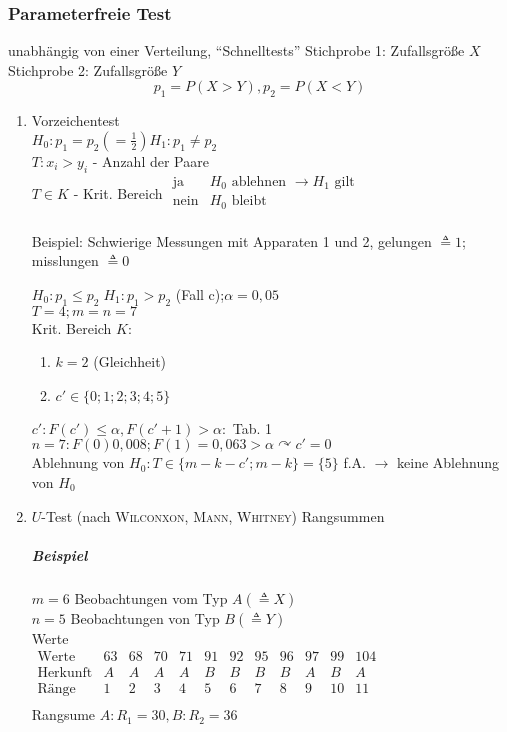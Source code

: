 \documentclass[a4paper]{scrartcl}
\begin{document}
\subsubsection{Parameterfreie Test}
unabhängig von einer Verteilung, "`Schnelltests"'
Stichprobe 1: Zufallsgröße $X$\\
Stichprobe 2: Zufallsgröße $Y$
\[ p_1 = P(X > Y), p_2 = P(X < Y)\]
\begin{enumerate}
\item Vorzeichentest\\
$H_0 : p_1 =p_2 (= \frac{1}{2}) H_1 : p_1 \neq p_2$\\
$T: x_i > y_i$ - Anzahl der Paare\\
$T \in K$ - Krit. Bereich $\begin{array}{lc} \text{ja} & H_0 \text{ ablehnen } \rightarrow H_1 \text{ gilt}\\ \text{nein} & H_0 \text{ bleibt} \\ \end{array}$

Beispiel: Schwierige Messungen mit Apparaten 1 und 2, gelungen $\triangleq 1$; misslungen $\triangleq 0$


$H_0: p_1 \leq p_2 \; H_1 : p_1 > p_2$ (Fall c);$\alpha = 0,05$\\
$T=4;m=n=7$\\
Krit. Bereich $K$:
\begin{enumerate}
\item $k=2$ (Gleichheit)
\item $c' \in \{ 0;1;2;3;4;5\}$
\end{enumerate}
$c' : F(c') \leq \alpha , F(c'+1) > \alpha :$ Tab. 1\\
$n=7 : F(0) 0,008; F(1) = 0,063 > \alpha \curvearrowright c'=0$\\
Ablehnung von $H_0: T \in \{ m - k -c'; m-k \} = \{5\}$ f.A. $\rightarrow$ keine Ablehnung von $H_0$

\item $U$-Test (nach \textsc{Wilconxon}, \textsc{Mann}, \textsc{Whitney}) Rangsummen

\subparagraph{Beispiel} $m= 6$ Beobachtungen vom Typ $A (\triangleq X)$\\
$n=5$ Beobachtungen von Typ $B (\triangleq Y)$\\
Werte\\
$\begin{array}{c|c|c|c|c|c|c|c|c|c|c|c}
\text{Werte} & 63 & 68 & 70 & 71 & 91 & 92 & 95 & 96 & 97 & 99 & 104\\
\text{Herkunft} & A & A & A & A & B & B & B & B & A & B & A\\
\text{Ränge} & 1 & 2 & 3 & 4 & 5 & 6 & 7 & 8 & 9 & 10 & 11\\
\end{array}$\\
Rangsume $A:R_1 = 30 , B: R_2 = 36$
\end{enumerate}
\end{document}
